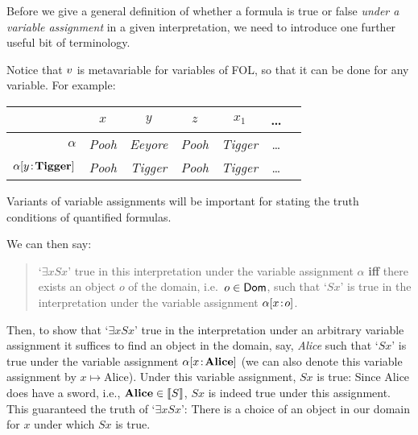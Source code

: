 Before we give a general definition of whether a formula is true or false \emph{under a variable assignment} in a given interpretation, we need to introduce one further useful bit of terminology.

Notice that $v$ is metavariable for variables of FOL, so that it can be done for any variable. 
For example:
\begin{center}
	\begin{tabular}{r@{\,:\quad}cccccc}
		\omit & $x$ & $y$ & $z$ & $x_1$ & \ldots \\ \hline
		$\alpha$ & \emph{Pooh} & \emph{Eeyore} & \emph{Pooh} & \emph{Tigger} & \ldots \\
		$\alpha[y \!:\! \textbf{Tigger}]$ & \emph{Pooh} & \emph{Tigger} & \emph{Pooh} & \emph{Tigger} & \ldots
	\end{tabular}
\end{center}

Variants of variable assignments will be important for stating the truth conditions of quantified formulas.

We can then say:
\begin{quote}
`$\exists x Sx$' true in this interpretation under the variable assignment $\alpha$ \textbf{iff} there exists an object $o$ of the domain, i.e.~$o\in \mathsf{Dom}$, such that `$Sx$' is true in the interpretation under the variable assignment $\alpha[x \!:\! o]$.
\end{quote}
Then, to show that `$\exists x Sx$' true in the interpretation under an arbitrary variable assignment it suffices to find an object in the domain, say, \emph{Alice} such that `$Sx$' is true under the variable assignment $\alpha[x \!:\! \text{\textbf{Alice}}]$  (we can also denote this variable assignment by $x\mapsto \text{Alice}$). Under this variable assignment, $Sx$ is true: Since Alice does have a sword, i.e., $\text{\textbf{Alice}}\in\llbracket S\rrbracket$, $Sx$ is indeed true under this assignment. This guaranteed the truth of `$\exists x Sx$': There is a choice of an object in our domain for $x$ under which $Sx$ is true.

